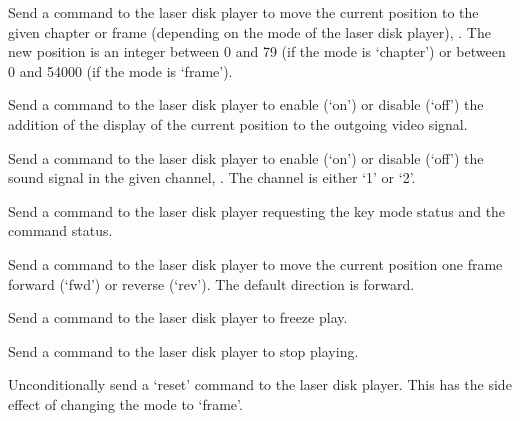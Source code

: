   Send a command to the laser disk player to move the current position to the given chapter or frame
  (depending on the mode of the laser disk player), .
  The new position is an integer between 0 and 79 (if the mode is `chapter') or between 0 and
  54000 (if the mode is `frame').
  
  Send a command to the laser disk player to enable (`on') or disable (`off') the addition of the
  display of the current position to the outgoing video signal.
  
  Send a command to the laser disk player to enable (`on') or disable (`off') the sound signal in
  the given channel, .
  The channel is either `1' or `2'.
  
  Send a command to the laser disk player requesting the key mode status and the command status.
  
  Send a command to the laser disk player to move the current position one frame forward (`fwd') or
  reverse (`rev').
  The default direction is forward.
  
  Send a command to the laser disk player to freeze play.
  
  Send a command to the laser disk player to stop playing.
  
  Unconditionally send a `reset' command to the laser disk player.
  This has the side effect of changing the mode to `frame'.
  
  \objListCmdEnd

\objItemFile

\objItemMessage




%
%
%
